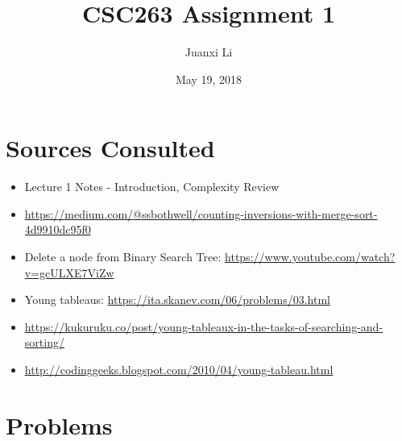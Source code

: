 \documentclass{article}
\title{CSC263 Assignment 1}
\author{Juanxi Li}
\date{May 19, 2018}
\begin{document}
\maketitle

\section*{Sources Consulted}

\begin{itemize}
    \item Lecture 1 Notes - Introduction, Complexity Review
    \item \url{https://medium.com/@ssbothwell/counting-inversions-with-merge-sort-4d9910dc95f0}{}
    \item Delete a node from Binary Search Tree: \url{https://www.youtube.com/watch?v=gcULXE7ViZw}
    \item Young tableaus: \url{https://ita.skanev.com/06/problems/03.html}
    \item \url{https://kukuruku.co/post/young-tableaux-in-the-tasks-of-searching-and-sorting/}
   	\item \url{http://codinggeeks.blogspot.com/2010/04/young-tableau.html}

\end{itemize}

\section*{Problems}
\end{document}
